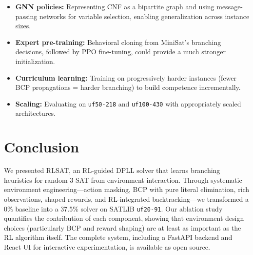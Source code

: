 \documentclass{article}
\begin{document}
\begin{itemize}
    \item \textbf{GNN policies:} Representing CNF as a bipartite graph and using message-passing networks for variable selection, enabling generalization across instance sizes.
    \item \textbf{Expert pre-training:} Behavioral cloning from MiniSat's branching decisions, followed by PPO fine-tuning, could provide a much stronger initialization.
    \item \textbf{Curriculum learning:} Training on progressively harder instances (fewer BCP propagations = harder branching) to build competence incrementally.
    \item \textbf{Scaling:} Evaluating on \texttt{uf50-218} and \texttt{uf100-430} with appropriately scaled architectures.
\end{itemize}

\section{Conclusion}

We presented RLSAT, an RL-guided DPLL solver that learns branching heuristics for random 3-SAT from environment interaction. Through systematic environment engineering---action masking, BCP with pure literal elimination, rich observations, shaped rewards, and RL-integrated backtracking---we transformed a 0\% baseline into a 37.5\% solver on SATLIB \texttt{uf20-91}. Our ablation study quantifies the contribution of each component, showing that environment design choices (particularly BCP and reward shaping) are at least as important as the RL algorithm itself. The complete system, including a FastAPI backend and React UI for interactive experimentation, is available as open source.



\end{document}

